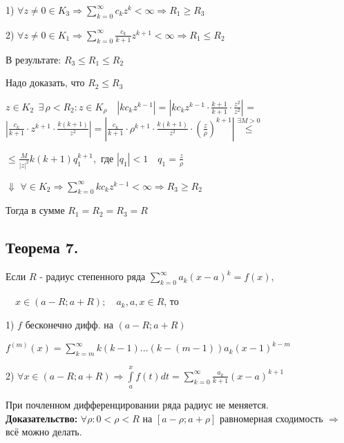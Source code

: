 \documentclass[a4paper,12pt]{article} %
\begin{document}
    1) $\forall z \neq 0 \in K_3 \Rightarrow \sum\limits_{k = 0}^\infty c_k z^k < \infty \Rightarrow R_1 \geqslant R_3$
    
    2) $\forall z \neq 0 \in K_1 \Rightarrow \sum\limits_{k = 0}^\infty \frac{c_k}{k + 1} z^{k+1} < \infty \Rightarrow R_1 \leqslant R_2$
    
    В результате: $R_3 \leqslant R_1 \leqslant R_2 $

    Надо доказать, что $R_2 \leqslant R_3$

    $z \in K_2 \ \  \exists \, \rho < R_2: z \in K_{\rho} \quad |k c_k z^{k - 1}| = |k c_k z^{k - 1} \cdot \frac{k + 1}{k + 1} \cdot \frac{z^2}{z^2}|$ = 
    $|\frac{c_k}{k + 1} \cdot z^{k + 1} \cdot \frac{k(k+1)}{z^2}| = | \frac{c_k}{k + 1} \cdot \rho^{k + 1} \cdot \frac{k(k + 1)}{z^2} \cdot \left( \frac{z}{\rho} \right)^{k + 1}| \stackrel{\exists M > 0}{\leqslant} $
    
    $\leqslant \frac{M}{|z|^2} k(k+1) q_1^{k + 1}, \text{ где } |q_1| < 1 \quad q_1 = \frac{z}{\rho}$
    
    \hspace*{3 cm} $\Downarrow$
    $\forall \in K_2 \Rightarrow \sum\limits_{k = 0}^\infty k c_k z^{k - 1} < \infty \Rightarrow R_3 \geqslant R_2$
    
    Тогда в сумме $R_1 = R_2 = R_3 = R$
    
      \subsection{Теорема 7.}
      Если $R$ - радиус степенного ряда $\sum\limits_{k = 0}^\infty a_k (x - a)^k = f(x), $
      
      $
      \quad x \in (a - R; a + R); \quad a_k, a, x \in R$, то
      
      1) $f$  бесконечно дифф. на $(a - R; a + R)$
      
      $f^{(m)}(x) = \sum\limits_{k = m}^\infty k(k-1) ... (k - (m - 1)) a_k (x - 1)^{k - m}$
      
      2) $\forall x \in (a - R; a + R) \Rightarrow \int\limits_{a}^{x} f(t) dt = \sum\limits_{k = 0}^\infty \frac{a_k}{k + 1} (x - a)^{k + 1}$ 

      При почленном дифференцировании ряда радиус не меняется.\\
      
      \textbf{Доказательство:}
      $\forall \rho: 0 < \rho < R  \text{ на } [a - \rho; a + \rho ]$ равномерная сходимость $\Rightarrow$ всё можно делать.\\
\end{document}
